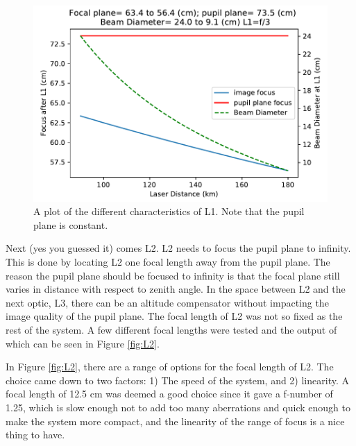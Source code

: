 \begin{figure}[h!]
\centering
\includegraphics[width=14 cm]{Figures/L1_dim.pdf}
\caption{A plot of the different characteristics of L1.  Note that the pupil plane is constant.}
\label{fig:L1}
\end{figure}

Next (yes you guessed it) comes L2.  L2 needs to focus the pupil plane to infinity.
This is done by locating L2 one focal length away from the pupil plane.  The reason
the pupil plane should be focused to infinity is that the focal plane still varies
in distance with respect to zenith angle.  In the space between L2 and the next
optic, L3, there can be an altitude compensator without impacting the image quality
of the pupil plane.  The focal length of L2 was not so fixed as the rest of the
system.  A few different focal lengths were tested and the output of which can be
seen in Figure \ref{fig:L2}.

In Figure \ref{fig:L2}, there are a range of options for the focal length of L2. 
The choice came down to two factors: 1) The speed of the system, and 2) linearity. 
A focal length of 12.5 cm was deemed a good choice since it gave a f-number of 1.25,
which is slow enough not to add too many aberrations and quick enough to make the
system more compact, and the linearity of the range of focus is a nice thing to
have.  

